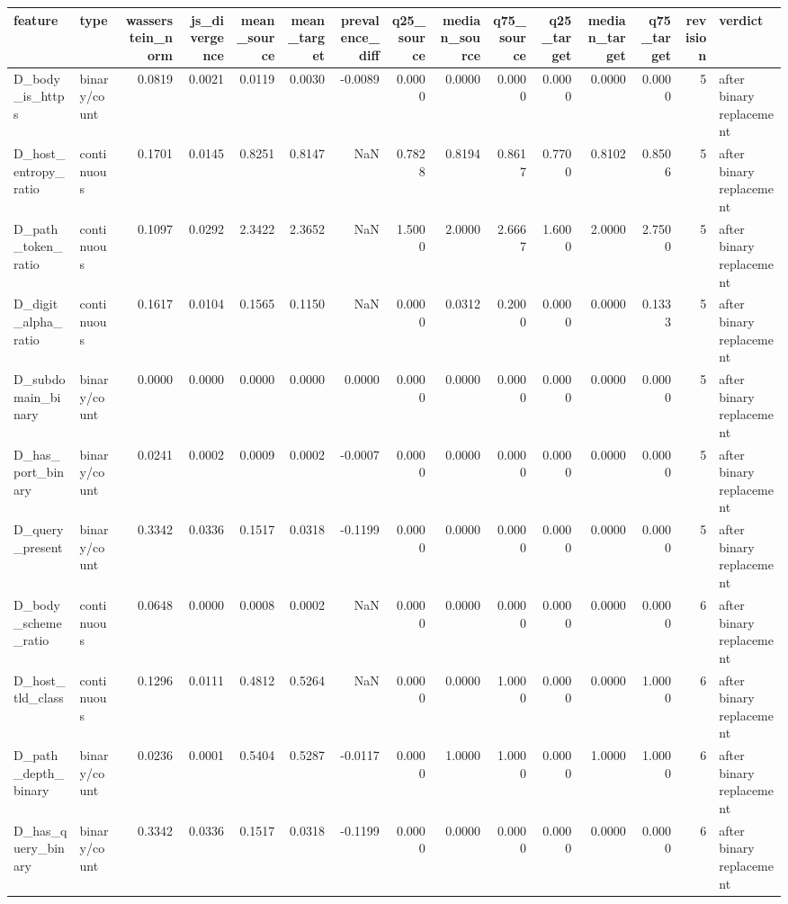 \begin{tabular}{llrrrrrrrrrrrrl}
\toprule
feature & type & wasserstein\_norm & js\_divergence & mean\_source & mean\_target & prevalence\_diff & q25\_source & median\_source & q75\_source & q25\_target & median\_target & q75\_target & revision & verdict \\
\midrule
D\_body\_is\_https & binary/count & 0.0819 & 0.0021 & 0.0119 & 0.0030 & -0.0089 & 0.0000 & 0.0000 & 0.0000 & 0.0000 & 0.0000 & 0.0000 & 5 & after binary replacement \\
D\_host\_entropy\_ratio & continuous & 0.1701 & 0.0145 & 0.8251 & 0.8147 & NaN & 0.7828 & 0.8194 & 0.8617 & 0.7700 & 0.8102 & 0.8506 & 5 & after binary replacement \\
D\_path\_token\_ratio & continuous & 0.1097 & 0.0292 & 2.3422 & 2.3652 & NaN & 1.5000 & 2.0000 & 2.6667 & 1.6000 & 2.0000 & 2.7500 & 5 & after binary replacement \\
D\_digit\_alpha\_ratio & continuous & 0.1617 & 0.0104 & 0.1565 & 0.1150 & NaN & 0.0000 & 0.0312 & 0.2000 & 0.0000 & 0.0000 & 0.1333 & 5 & after binary replacement \\
D\_subdomain\_binary & binary/count & 0.0000 & 0.0000 & 0.0000 & 0.0000 & 0.0000 & 0.0000 & 0.0000 & 0.0000 & 0.0000 & 0.0000 & 0.0000 & 5 & after binary replacement \\
D\_has\_port\_binary & binary/count & 0.0241 & 0.0002 & 0.0009 & 0.0002 & -0.0007 & 0.0000 & 0.0000 & 0.0000 & 0.0000 & 0.0000 & 0.0000 & 5 & after binary replacement \\
D\_query\_present & binary/count & 0.3342 & 0.0336 & 0.1517 & 0.0318 & -0.1199 & 0.0000 & 0.0000 & 0.0000 & 0.0000 & 0.0000 & 0.0000 & 5 & after binary replacement \\
D\_body\_scheme\_ratio & continuous & 0.0648 & 0.0000 & 0.0008 & 0.0002 & NaN & 0.0000 & 0.0000 & 0.0000 & 0.0000 & 0.0000 & 0.0000 & 6 & after binary replacement \\
D\_host\_tld\_class & continuous & 0.1296 & 0.0111 & 0.4812 & 0.5264 & NaN & 0.0000 & 0.0000 & 1.0000 & 0.0000 & 0.0000 & 1.0000 & 6 & after binary replacement \\
D\_path\_depth\_binary & binary/count & 0.0236 & 0.0001 & 0.5404 & 0.5287 & -0.0117 & 0.0000 & 1.0000 & 1.0000 & 0.0000 & 1.0000 & 1.0000 & 6 & after binary replacement \\
D\_has\_query\_binary & binary/count & 0.3342 & 0.0336 & 0.1517 & 0.0318 & -0.1199 & 0.0000 & 0.0000 & 0.0000 & 0.0000 & 0.0000 & 0.0000 & 6 & after binary replacement \\

\end{tabular}
